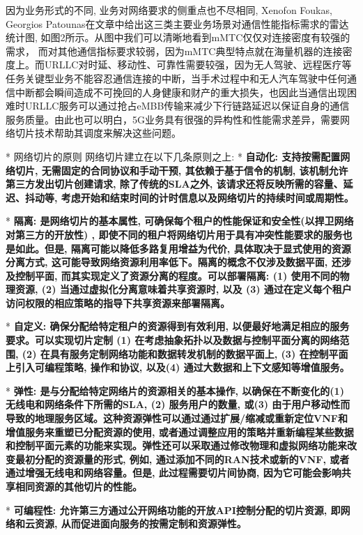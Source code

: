         因为业务形式的不同, 业务对网络要求的侧重点也不尽相同, Xenofon Foukas, Georgios Patounas在文章中给出这三类主要业务场景对通信性能指标需求的雷达统计图, 如图2所示。从图中我们可以清晰地看到mMTC仅仅对连接密度有较强的需求， 而对其他通信指标要求较弱，因为mMTC典型特点就在海量机器的连接密度上。而URLLC对时延、移动性、可靠性需要较强，因为无人驾驶、远程医疗等任务关键型业务不能容忍通信连接的中断，当手术过程中和无人汽车驾驶中任何通信中断都会瞬间造成不可挽回的人身健康和财产的重大损失，也因此当通信出现困难时URLLC服务可以通过抢占eMBB传输来减少下行链路延迟以保证自身的通信服务质量。由此也可以明白，5G业务具有很强的异构性和性能需求差异，需要网络切片技术帮助其调度来解决这些问题。
        
    * 网络切片的原则
        网络切片建立在以下几条原则之上: 
        * \bf{自动化}: 支持按需配置网络切片, 无需固定的合同协议和手动干预, 其依赖于基于信令的机制, 该机制允许第三方发出切片创建请求, 除了传统的SLA之外, 该请求还将反映所需的容量、延迟、抖动等, 考虑开始和结束时间的计时信息以及网络切片的持续时间或周期性。

        * \bf{隔离}: 是网络切片的基本属性, 可确保每个租户的性能保证和安全性(以捍卫网络对第三方的开放性) , 即使不同的租户将网络切片用于具有冲突性能要求的服务也是如此。但是, 隔离可能以降低多路复用增益为代价, 具体取决于显式使用的资源分离方式, 这可能导致网络资源利用率低下。隔离的概念不仅涉及数据平面, 还涉及控制平面, 而其实现定义了资源分离的程度。可以部署隔离: (1)  使用不同的物理资源, (2)  当通过虚拟化分离意味着共享资源时, 以及 (3) 通过在定义每个租户访问权限的相应策略的指导下共享资源来部署隔离。

        * \bf{自定义}: 确保分配给特定租户的资源得到有效利用, 以便最好地满足相应的服务要求。可以实现切片定制 (1) 在考虑抽象拓扑以及数据与控制平面分离的网络范围, (2) 在具有服务定制网络功能和数据转发机制的数据平面上, (3) 在控制平面上引入可编程策略, 操作和协议, 以及(4) 通过大数据和上下文感知等增值服务。

        * \bf{弹性}: 是与分配给特定网络片的资源相关的基本操作, 以确保在不断变化的(1) 无线电和网络条件下所需的SLA, (2) 服务用户的数量, 或(3) 由于用户移动性而导致的地理服务区域。这种资源弹性可以通过通过扩展/缩减或重新定位VNF和增值服务来重塑已分配资源的使用, 或者通过调整应用的策略并重新编程某些数据和控制平面元素的功能来实现。弹性还可以采取通过修改物理和虚拟网络功能来改变最初分配的资源量的形式, 例如, 通过添加不同的RAN技术或新的VNF, 或者通过增强无线电和网络容量。但是, 此过程需要切片间协商, 因为它可能会影响共享相同资源的其他切片的性能。

        * \bf{可编程性}: 允许第三方通过公开网络功能的开放API控制分配的切片资源, 即网络和云资源, 从而促进面向服务的按需定制和资源弹性。

